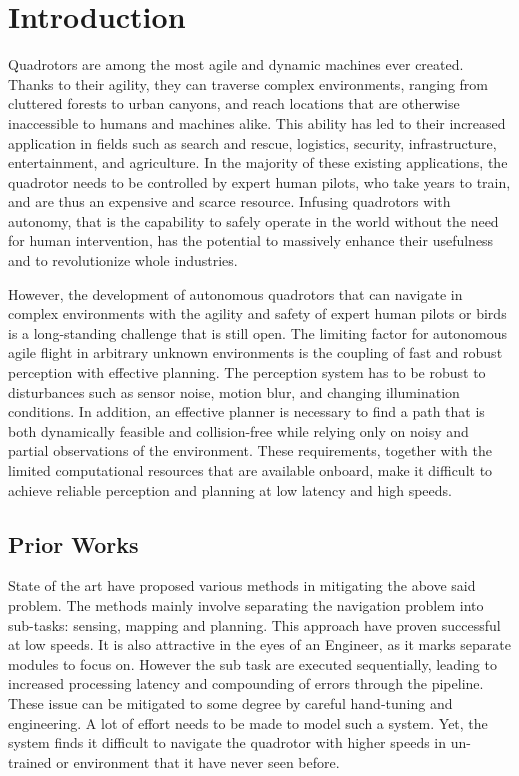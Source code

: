 \clearpage
\chapter{Introduction}

Quadrotors are among the most agile and dynamic machines ever created. Thanks to their agility, they can traverse complex environments, ranging from cluttered forests to urban canyons, and reach
locations that are otherwise inaccessible to humans and machines alike.
 This ability has led to their increased application in fields such as search and
rescue, logistics, security, infrastructure, entertainment, and agriculture. In the majority of these existing applications, the quadrotor needs to be controlled by expert human pilots, who take years to train,
and are thus an expensive and scarce resource. Infusing quadrotors
with autonomy, that is the capability to safely operate in the world without the need for human intervention, has the potential to massively
enhance their usefulness and to revolutionize whole industries. 

However, the development of autonomous quadrotors that can navigate in
complex environments with the agility and safety of expert human pilots or birds is a long-standing challenge that is still open. The limiting factor for autonomous agile flight in arbitrary unknown
environments is the coupling of fast and robust perception with effective
planning. The perception system has to be robust to disturbances such
as sensor noise, motion blur, and changing illumination conditions. In
addition, an effective planner is necessary to find a path that is both
dynamically feasible and collision-free while relying only on noisy and
partial observations of the environment. These requirements, together
with the limited computational resources that are available onboard,
make it difficult to achieve reliable perception and planning at low
latency and high speeds.

\section{Prior Works}
State of the art have proposed various methods in mitigating the above said problem. The methods mainly involve separating the navigation problem into sub-tasks: sensing, mapping and planning. This approach have proven successful at low speeds. It is also attractive in the eyes of an Engineer, as it marks separate modules to focus on. However the sub task are executed sequentially, leading to increased processing latency and compounding of errors through the pipeline. These issue can be mitigated to some degree by careful hand-tuning and engineering. A lot of effort needs to be made to model such a system. Yet, the system finds it difficult to navigate the quadrotor with higher speeds in un-trained or environment that it have never seen before.

